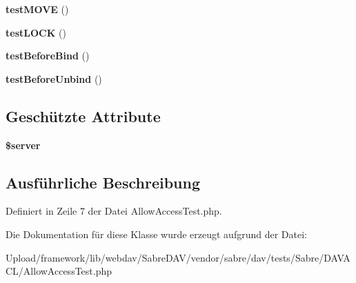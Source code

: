 \begin{DoxyCompactItemize}
{\bfseries test\+M\+O\+VE} ()
\item 
\mbox{\label{class_sabre_1_1_d_a_v_a_c_l_1_1_allow_access_test_a4b6ada0acae1d2843bc80e15ff870e3d}} 
{\bfseries test\+L\+O\+CK} ()
\item 
\mbox{\label{class_sabre_1_1_d_a_v_a_c_l_1_1_allow_access_test_af67cc4524baa638b50a883e388d7cd05}} 
{\bfseries test\+Before\+Bind} ()
\item 
\mbox{\label{class_sabre_1_1_d_a_v_a_c_l_1_1_allow_access_test_abf8066cf71c183c68790713a621694da}} 
{\bfseries test\+Before\+Unbind} ()
\end{DoxyCompactItemize}
\subsection*{Geschützte Attribute}
\begin{DoxyCompactItemize}
\item 
\mbox{\label{class_sabre_1_1_d_a_v_a_c_l_1_1_allow_access_test_aa8cd9cc60598a37bcacad674646e3bf9}} 
{\bfseries \$server}
\end{DoxyCompactItemize}


\subsection{Ausführliche Beschreibung}


Definiert in Zeile 7 der Datei Allow\+Access\+Test.\+php.



Die Dokumentation für diese Klasse wurde erzeugt aufgrund der Datei\+:\begin{DoxyCompactItemize}
\item 
Upload/framework/lib/webdav/\+Sabre\+D\+A\+V/vendor/sabre/dav/tests/\+Sabre/\+D\+A\+V\+A\+C\+L/Allow\+Access\+Test.\+php\end{DoxyCompactItemize}
